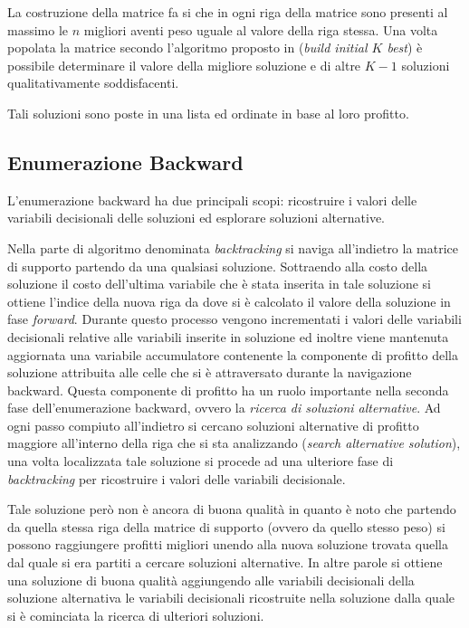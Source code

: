 \documentclass{llncs}
\newcommand{\labelssec}[1]{\label{ssec:#1}}
\begin{document}
La costruzione della matrice fa si che in ogni riga della matrice sono presenti al massimo le $n$ migliori aventi peso uguale al valore della riga stessa. Una volta popolata la matrice secondo l'algoritmo proposto in \cite{YANASSE2000} (\emph{build initial $K$ best}) è possibile determinare il valore della migliore soluzione e di altre $K-1$ soluzioni qualitativamente soddisfacenti.

Tali soluzioni sono poste in una lista ed ordinate in base al loro profitto.

\subsection{Enumerazione Backward}
\labelssec{backward}

L'enumerazione backward ha due principali scopi: ricostruire i valori delle variabili decisionali delle soluzioni ed esplorare soluzioni alternative.

Nella parte di algoritmo denominata \emph{backtracking} si naviga all'indietro la matrice di supporto partendo da una qualsiasi soluzione. Sottraendo alla costo della soluzione il costo dell'ultima variabile che è stata inserita in tale soluzione si ottiene l'indice della nuova riga da dove si è calcolato il valore della soluzione in fase \emph{forward}. Durante questo processo vengono incrementati i valori delle variabili decisionali relative alle variabili inserite in soluzione ed inoltre viene mantenuta aggiornata una variabile accumulatore contenente la componente di profitto della soluzione attribuita alle celle che si è attraversato durante la navigazione backward.
Questa componente di profitto ha un ruolo importante nella seconda fase dell'enumerazione backward, ovvero la \emph{ricerca di soluzioni alternative}.
Ad ogni passo compiuto all'indietro si cercano soluzioni alternative di profitto maggiore all'interno della riga che si sta analizzando (\emph{search alternative solution}), una volta localizzata tale soluzione si procede ad una ulteriore fase di \emph{backtracking} per ricostruire i valori delle variabili decisionale. 

Tale soluzione però non è ancora di buona qualità in quanto è noto che partendo da quella stessa riga della matrice di supporto (ovvero da quello stesso peso) si possono raggiungere profitti migliori unendo alla nuova soluzione trovata quella dal quale si era partiti a cercare soluzioni alternative. 
In altre parole si ottiene una soluzione di buona qualità aggiungendo alle variabili decisionali della soluzione alternativa le variabili decisionali ricostruite nella soluzione dalla quale si è cominciata la ricerca di ulteriori soluzioni.  
\end{document}
